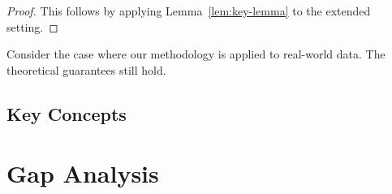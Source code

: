 \begin{proof}
This follows by applying Lemma~\ref{lem:key-lemma} to the extended setting.
\end{proof}

\begin{example}
\label{ex:concrete}
Consider the case where our methodology is applied to real-world data. The theoretical guarantees still hold.
\end{example}

\lipsum[14-15]

\subsection{Key Concepts}
\label{subsec:key-concepts}

\lipsum[16]

\section{Gap Analysis}
\label{sec:gap-analysis}

\lipsum[17-18]
